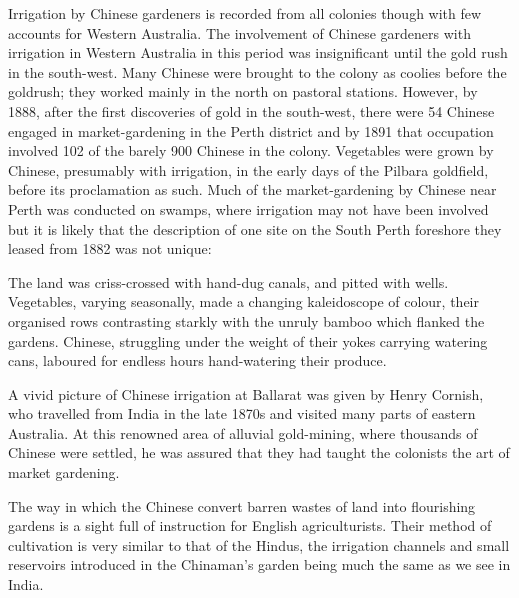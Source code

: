 Irrigation by Chinese  gardeners is recorded from all
colonies though with few accounts for Western
Australia.  The involvement of Chinese
gardeners with irrigation in Western Australia in this period was
insignificant until the gold rush in the south-west.  Many Chinese
were brought to the colony as coolies before the goldrush; they worked
main\-ly in the north on pastoral stations.  However, by 1888, after
the first discoveries of gold in the south-west, there were 54 Chinese
engaged in market-gardening in the Perth district and by 1891 that
occupation involved 102 of the barely 900 Chinese in the colony.
Vegetables were grown by Chinese, presumably with irrigation, in the
early days of the Pilbara  goldfield, before its
proclamation as such.  Much of the
market-gardening by Chinese near Perth  was conducted
on swamps, where irrigation may not have been involved but it is
likely that the description of one site on the South Perth foreshore
they leased from 1882 was not unique:
\begin{Quote}
	The land was criss-crossed with hand-dug
	canals, and pitted with
	wells.  Vegetables, varying seasonally, made a changing
	kaleidoscope of colour, their organised rows contrasting
	starkly with the unruly bamboo which flanked the gardens.
	Chinese, struggling under the weight of their yokes carrying
	watering cans, laboured for endless hours hand-watering their
	produce.
\end{Quote}

A vivid picture of Chinese irrigation at Ballarat
 was given by Henry Cornish, 
who travelled from India in the late 1870s and visited many parts of
eastern Australia. At this renowned area of alluvial gold-min\-ing,
 where thousands of Chinese were settled, he was
assured that they had taught the colonists the art of market
gardening.
\begin{Quote}
	The way in which the Chinese convert barren wastes of land
	into flourishing gardens is a sight full of instruction for
	English agriculturists. Their method of cultivation is very
	similar to that of the Hindus, the irrigation
	channels and small
	reservoirs introduced in the
	Chinaman's garden being much the same as we see in
	India.
\end{Quote}

